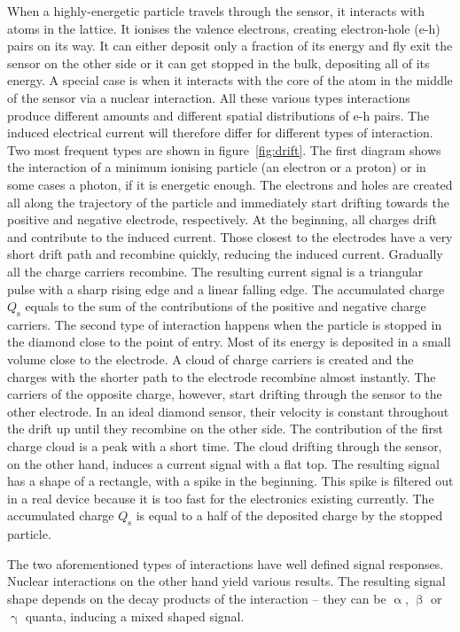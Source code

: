 \begin{figure}[!t]
\end{figure}When a highly-energetic particle travels through the sensor, it interacts with atoms in the lattice. It ionises the valence electrons, creating electron-hole (e-h) pairs on its way. It can either deposit only a fraction of its energy and fly exit the sensor on the other side or it can get stopped in the bulk, depositing all of its energy. A special case is when it interacts with the core of the atom in the middle of the sensor via a nuclear interaction. All these various types interactions produce different amounts and different spatial distributions of e-h pairs. The induced electrical current will therefore differ for different types of interaction. Two most frequent types are shown in figure~\ref{fig:drift}. The first diagram shows the interaction of a minimum ionising particle (an electron or a proton) or in some cases a photon, if it is energetic enough. The electrons and holes are created all along the trajectory of the particle and immediately start drifting towards the positive and negative electrode, respectively. At the beginning, all charges drift and contribute to the induced current. Those closest to the electrodes have a very short drift path and recombine quickly, reducing the induced current. Gradually all the charge carriers recombine. The resulting current signal is a triangular pulse with a sharp rising edge and a linear falling edge. The accumulated charge $Q_\mathrm{s}$ equals to the sum of the contributions of the positive and negative charge carriers. The second type of interaction happens when the particle is stopped in the diamond close to the point of entry. Most of its energy is deposited in a small volume close to the electrode. A cloud of charge carriers is created and the charges with the shorter path to the electrode recombine almost instantly. The carriers of the opposite charge, however, start drifting through the sensor to the other electrode. In an ideal diamond sensor, their velocity is constant throughout the drift up until they recombine on the other side. The contribution of the first charge cloud is a peak with a short time. The cloud drifting through the sensor, on the other hand, induces a current signal with a flat top. The resulting signal has a shape of a rectangle, with a spike in the beginning. This spike is filtered out in a real device because it is too fast for the electronics existing currently. The accumulated charge $Q_\mathrm{s}$ is equal to a half of the deposited charge by the stopped particle.

The two aforementioned types of interactions have well defined signal responses. Nuclear interactions on the other hand yield various results. The resulting signal shape depends on the decay products of the interaction -- they can be $\upalpha$, $\upbeta$ or $\upgamma$ quanta, inducing a mixed shaped signal. 
%


